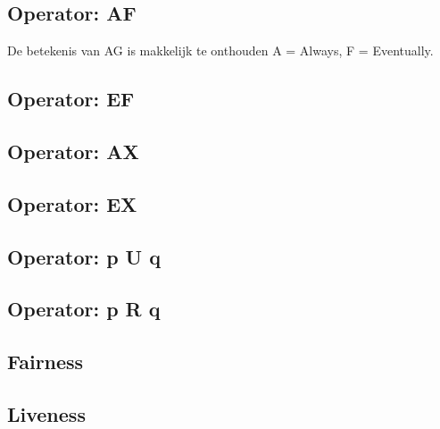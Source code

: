 \documentclass{article}%
\begin{document}
\subsection{Operator: AF}
De betekenis van AG is makkelijk te onthouden A = Always, F = Eventually.
\subsection{Operator: EF}

\subsection{Operator: AX}

\subsection{Operator: EX}

\subsection{Operator: p U q}

\subsection{Operator: p R q}

\subsection{Fairness}

\subsection{Liveness}

\newpage

\newpage


\end{document}
